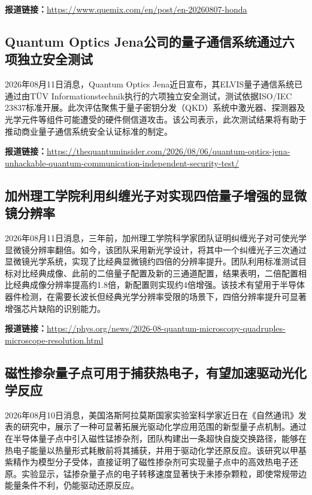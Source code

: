 \documentclass[12pt,a4paper]{ctexart}
\begin{document}
\noindent\textbf{报道链接：}\url{https://www.quemix.com/en/post/en-20260807-honda}

\subsection{ Quantum Optics Jena公司的量子通信系统通过六项独立安全测试 }

2026年08月11日消息，Quantum Optics Jena近日宣布，其ELVIS量子通信系统已通过由TÜV Informationstechnik执行的六项独立安全测试，测试依据ISO/IEC 23837标准开展。此次评估聚焦于量子密钥分发（QKD）系统中激光器、探测器及光学元件等组件可能遭受的硬件侧信道攻击。该公司表示，此次测试结果将有助于推动商业量子通信系统安全认证标准的制定。

\noindent\textbf{报道链接：}\url{https://thequantuminsider.com/2026/08/06/quantum-optics-jena-unhackable-quantum-communication-independent-security-test/}

\subsection{ 加州理工学院利用纠缠光子对实现四倍量子增强的显微镜分辨率 }

2026年08月11日消息，三年前，加州理工学院科学家团队证明纠缠光子对可使光学显微镜分辨率翻倍。如今，该团队采用新光学设计，将其中一个纠缠光子三次通过显微镜光学系统，实现了比经典显微镜约四倍的分辨率提升。团队利用标准测试目标对比经典成像、此前的二倍量子配置及新的三通道配置，结果表明，二倍配置相比经典成像分辨率提高约1.8倍，新配置则实现约4倍增强。该技术有望用于半导体器件检测，在需要长波长但经典光学分辨率受限的场景下，四倍分辨率提升可显著增强芯片缺陷的识别能力。

\noindent\textbf{报道链接：}\url{https://phys.org/news/2026-08-quantum-microscopy-quadruples-microscope-resolution.html}

\subsection{ 磁性掺杂量子点可用于捕获热电子，有望加速驱动光化学反应 }

2026年08月10日消息，美国洛斯阿拉莫斯国家实验室科学家近日在《自然通讯》发表的研究中，展示了一种可显著拓展光驱动化学应用范围的新型量子点机制。通过在半导体量子点中引入磁性锰掺杂剂，团队构建出一条超快自旋交换路径，能够在热电子能量以热量形式耗散前将其捕获，并用于驱动化学还原反应。该研究以甲基紫精作为模型分子受体，直接证明了磁性掺杂剂可实现量子点中的高效热电子还原。实验显示，锰掺杂量子点的电子转移速度显著快于未掺杂颗粒，即使常规带边能量条件不利，仍能驱动还原反应。
\end{document}
